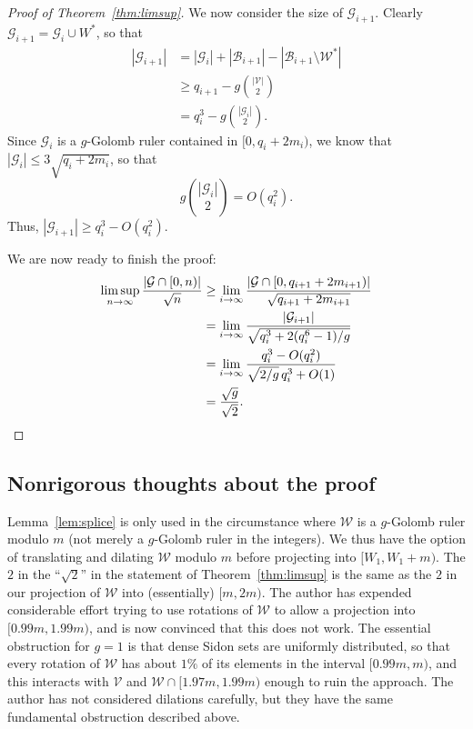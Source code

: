 \documentclass[10pt]{article}
\newcommand{\cG}{\mathcal{G}}
\newcommand{\cV}{\mathcal{V}}
\newcommand{\cW}{\mathcal{W}}
\newcommand{\cB}{\mathcal{B}}
\begin{document}
\begin{proof}[Proof of Theorem~\ref{thm:limsup}]
We now consider the size of $\cG_{i+1}$. Clearly $\cG_{i+1} = \cG_i \cup W^{*}$, so that 
  \begin{align*}
    |\cG_{i+1} | 
      &= |\cG_i| + |\cB_{i+1}| - |\cB_{i+1} \setminus \cW^{*}| \\
      &\ge q_{i+1} -g \binom{|\cV|}{2} \\
      &= q_i^3 - g \binom{|\cG_i|}{2}.
  \end{align*}
Since $\cG_i$ is a $g$-Golomb ruler contained in $[0,q_i+2m_i)$, we know that $|\cG_i| \le 3\sqrt{q_i+2m_i}$, so that
  \[g \binom{|\cG_i|}{2} =O( q_i^2).\]
Thus, \( |\cG_{i+1}| \ge q_i^3- O(q_i^2). \)

We are now ready to finish the proof:
\begin{align*}
  \limsup_{n\to \infty} \frac{|\cG \cap [0,n)|}{\sqrt{n}}
  &\ge \lim_{i\to \infty} \frac{|\cG \cap [0,q_{i+1}+2m_{i+1})|}{\sqrt{q_{i+1}+2m_{i+1}}} \\
  &= \lim_{i\to\infty} \frac{ |\cG_{i+1}| }{\sqrt{q_i^3+2(q_i^6-1)/g }} \\
  &= \lim_{i\to\infty} \frac{q_i^3 - O(q_i^2)}{\sqrt{2/g } \, q_i^3+O(1)} \\
  &= \frac{\sqrt g }{\sqrt 2}. \qedhere
\end{align*}
\end{proof}

\subsection{Nonrigorous thoughts about the proof}
Lemma~\ref{lem:splice} is only used in the circumstance where $\cW$ is a $g$-Golomb ruler modulo $m$ (not merely a $g$-Golomb ruler in the integers). We thus have the option of translating and dilating $\cW$ modulo $m$ before projecting into $[W_1,W_1+m)$. The $2$ in the ``$\sqrt{2}$'' in the statement of Theorem~\ref{thm:limsup} is the same as the $2$ in our projection of $\cW$ into (essentially) $[m,2m)$. The author has expended considerable effort trying to use rotations of $\cW$ to allow a projection into $[0.99m,1.99m)$, and is now convinced that this does not work. The essential obstruction for $g =1$ is that dense Sidon sets are uniformly distributed, so that every rotation of $\cW$ has about $1\%$ of its elements in the interval $[0.99m,m)$, and this interacts with $\cV$ and $\cW\cap[1.97m,1.99m)$ enough to ruin the approach. The author has not considered dilations carefully, but they have the same fundamental obstruction described above.
\end{document}
